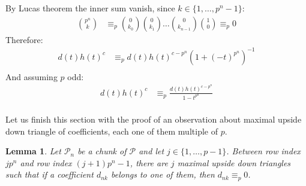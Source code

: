\documentclass[10pt,a4paper]{article} %
\newtheorem{lemma}[theorem]{Lemma}
\begin{document}
    By Lucas theorem the inner sum vanish, since $k\in\lbrace 1, \ldots, p^n -1 \rbrace$:
      \begin{displaymath}
        \begin{split}
          {{p^n} \choose {k}} &\equiv_{p} {{0} \choose {k_0}} {{0} \choose {k_1}} \ldots 
          {{0} \choose {k_{n-1}}}{{1} \choose {0}}\equiv_{p} 0 
        \end{split}
      \end{displaymath}
    Therefore:
      \begin{displaymath}
          \begin{split}
                d(t)h(t)^{c} &\equiv_p d(t)h(t)^{c-p^n}\left(1 + (-t)^{p^n}\right)^{-1} \\
          \end{split}
      \end{displaymath}
    And assuming $p$ odd:
      \begin{displaymath}
          \begin{split}
                d(t)h(t)^{c} &\equiv_p \frac{d(t)h(t)^{c-p^n}}{1 - t^{p^n}} \\
          \end{split}
      \end{displaymath}

    Let us finish this section with the proof of an observation about
    maximal upside down triangle of coefficients, each one of them 
    multiple of $p$.

    \begin{lemma}
        Let $\mathcal{P}_n$ be a chunk of $\mathcal{P}$ and let $j\in
        \lbrace 1, \ldots, p-1 \rbrace$. Between row index $j p^n$ and
        row index $(j+1)p^n -1$, there are $j$ maximal upside down triangles
        such that if a coefficient $d_{nk}$ belongs to one of them, then 
        $d_{nk} \equiv_{p} 0$.
    \end{lemma}
\end{document}
